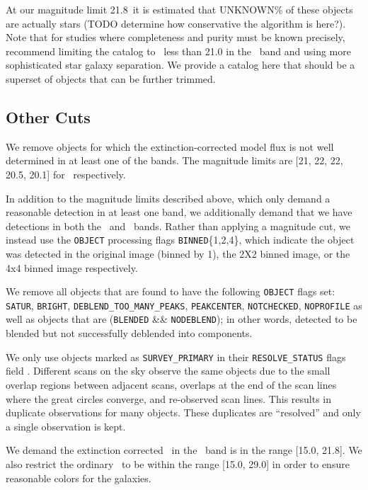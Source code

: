 \documentclass[preprint]{aastex}
\newcommand{\modelrmin}{15.0}
\newcommand{\modelrmax}{29.0}
\newcommand{\rmin}{15.0}
\newcommand{\rmax}{21.8}
\newcommand{\contam}{{\color{red} UNKNOWN}}
\begin{document}
At our magnitude limit \rmax\ it is estimated that \contam\% of these objects
are actually stars (TODO determine how conservative the algorithm is here?).
Note that for studies where completeness and purity must be known precisely,
\citet{ScrantonMag05} recommend limiting the catalog to \cmodelmag\ less than
21.0 in the \rmag\ band and using more sophisticated star galaxy separation. We
provide a catalog here that should be a superset of objects that can be further
trimmed.

\subsection{Other Cuts}

We remove objects for which the extinction-corrected model flux is not well
determined in at least one of the bands.  The magnitude limits are [21, 22, 22,
20.5, 20.1] for \allmag\ respectively.

In addition to the magnitude limits described above, which only demand a
reasonable detection in at least one band, we additionally demand that we have
detections in both the \rmag\ and \imag\ bands.  Rather than applying a
magnitude cut, we instead use the \texttt{OBJECT} processing flags
\texttt{BINNED}\{1,2,4\}, which indicate the object was detected in the original
image (binned by 1), the 2X2 binned image, or the 4x4 binned image respectively.

We remove all objects that are found to have the following \texttt{OBJECT}
flags set: \texttt{SATUR}, \texttt{BRIGHT}, \texttt{DEBLEND\_TOO\_MANY\_PEAKS},
\texttt{PEAKCENTER}, \texttt{NOTCHECKED}, \texttt{NOPROFILE} as well as objects
that are (\texttt{BLENDED} \&\& \texttt{NODEBLEND}); in other words, detected
to be blended but not successfully deblended into components. 

We only use objects marked as \texttt{SURVEY\_PRIMARY} in their
\texttt{RESOLVE\_STATUS} flags field \citep{dr7resolve}. Different scans on the
sky observe the same objects due to the small overlap regions between adjacent
scans, overlaps at the end of the scan lines where the great circles converge,
and re-observed scan lines.  This results in duplicate observations for many
objects.  These duplicates are ``resolved'' and only a single observation is
kept.

We demand the extinction corrected \citep{Schlegel98} \cmodelmag\ in the \rmag\
band is in the range [\rmin, \rmax].  We also restrict the ordinary \modelmag\
to be within the range [\modelrmin, \modelrmax] in order to ensure reasonable
colors for the galaxies.
\end{document}
